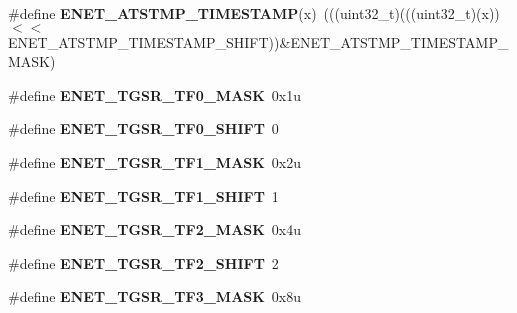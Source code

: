 \begin{DoxyCompactItemize}
\item 
\#define {\bfseries E\+N\+E\+T\+\_\+\+A\+T\+S\+T\+M\+P\+\_\+\+T\+I\+M\+E\+S\+T\+A\+MP}(x)~(((uint32\+\_\+t)(((uint32\+\_\+t)(x))$<$$<$E\+N\+E\+T\+\_\+\+A\+T\+S\+T\+M\+P\+\_\+\+T\+I\+M\+E\+S\+T\+A\+M\+P\+\_\+\+S\+H\+I\+FT))\&E\+N\+E\+T\+\_\+\+A\+T\+S\+T\+M\+P\+\_\+\+T\+I\+M\+E\+S\+T\+A\+M\+P\+\_\+\+M\+A\+SK)\hypertarget{group__ENET__Register__Masks_gaddba4ddcc6f73e074fa2cfae50028ac9}{}\label{group__ENET__Register__Masks_gaddba4ddcc6f73e074fa2cfae50028ac9}

\item 
\#define {\bfseries E\+N\+E\+T\+\_\+\+T\+G\+S\+R\+\_\+\+T\+F0\+\_\+\+M\+A\+SK}~0x1u\hypertarget{group__ENET__Register__Masks_gac4b5286f5096d79e0c3a286ad49cf102}{}\label{group__ENET__Register__Masks_gac4b5286f5096d79e0c3a286ad49cf102}

\item 
\#define {\bfseries E\+N\+E\+T\+\_\+\+T\+G\+S\+R\+\_\+\+T\+F0\+\_\+\+S\+H\+I\+FT}~0\hypertarget{group__ENET__Register__Masks_ga636e49d8773de954ad946d32aa23eeb5}{}\label{group__ENET__Register__Masks_ga636e49d8773de954ad946d32aa23eeb5}

\item 
\#define {\bfseries E\+N\+E\+T\+\_\+\+T\+G\+S\+R\+\_\+\+T\+F1\+\_\+\+M\+A\+SK}~0x2u\hypertarget{group__ENET__Register__Masks_ga7cc2fdb7c10440f4ea4974b225588da0}{}\label{group__ENET__Register__Masks_ga7cc2fdb7c10440f4ea4974b225588da0}

\item 
\#define {\bfseries E\+N\+E\+T\+\_\+\+T\+G\+S\+R\+\_\+\+T\+F1\+\_\+\+S\+H\+I\+FT}~1\hypertarget{group__ENET__Register__Masks_ga05bf6e9ffee285ca3fb130b9c8948fa5}{}\label{group__ENET__Register__Masks_ga05bf6e9ffee285ca3fb130b9c8948fa5}

\item 
\#define {\bfseries E\+N\+E\+T\+\_\+\+T\+G\+S\+R\+\_\+\+T\+F2\+\_\+\+M\+A\+SK}~0x4u\hypertarget{group__ENET__Register__Masks_ga3bb5da9c3f3c88fc7784149aaf536e0c}{}\label{group__ENET__Register__Masks_ga3bb5da9c3f3c88fc7784149aaf536e0c}

\item 
\#define {\bfseries E\+N\+E\+T\+\_\+\+T\+G\+S\+R\+\_\+\+T\+F2\+\_\+\+S\+H\+I\+FT}~2\hypertarget{group__ENET__Register__Masks_ga8b692cdc1ae33167e75fc033385ea3f2}{}\label{group__ENET__Register__Masks_ga8b692cdc1ae33167e75fc033385ea3f2}

\item 
\#define {\bfseries E\+N\+E\+T\+\_\+\+T\+G\+S\+R\+\_\+\+T\+F3\+\_\+\+M\+A\+SK}~0x8u\hypertarget{group__ENET__Register__Masks_ga6346ae30393bacdf198cc24bbb538c4c}{}\label{group__ENET__Register__Masks_ga6346ae30393bacdf198cc24bbb538c4c}


\end{DoxyCompactItemize}
